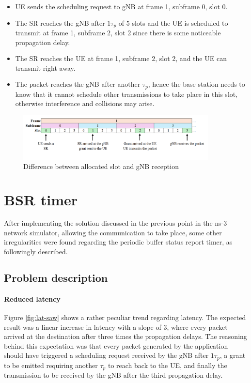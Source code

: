 \begin{itemize}
    \item \ac{UE} sends the scheduling request to \ac{gNB} at frame 1, subframe 0, slot 0.
    \item The \ac{SR} reaches the \ac{gNB} after $1\tau_p$ of 5 slots and the \ac{UE} is scheduled to transmit at frame 1, subframe 2, slot 2 since there is some noticeable propagation delay.
    \item The \ac{SR} reaches the \ac{UE} at frame 1, subframe 2, slot 2, and the \ac{UE} can transmit right away.
    \item The packet reaches the \ac{gNB} after another $\tau_p$, hence the base station needs to know that it cannot schedule other transmissions to take place in this slot, otherwise interference and collisions may arise.
\end{itemize}

\begin{figure}[ht]
    \centering
    \includegraphics[width=0.9\textwidth]{res/scheduler-allocation-pd.png}
    \caption{Difference between allocated slot and gNB reception}
    \label{fig:scheduler-allocations-pd}
\end{figure}

\section{BSR timer}
\label{sec:bsr-timer}
After implementing the solution discussed in the previous point in the ns-3 network simulator, allowing the communication to take place, some other irregularities were found regarding the periodic buffer status report timer, as followingly described. 

\subsection{Problem description}

\paragraph{Reduced latency}

Figure \ref{fig:lat-saw} shows a rather peculiar trend regarding latency. The expected result was a linear increase in latency with a slope of 3, where every packet arrived at the destination after three times the propagation delays. The reasoning behind this expectation was that every packet generated by the application should have triggered a scheduling request received by the \ac{gNB} after $1\tau_p$, a grant to be emitted requiring another $\tau_p$ to reach back to the \ac{UE}, and finally the transmission to be received by the \ac{gNB} after the third propagation delay.

